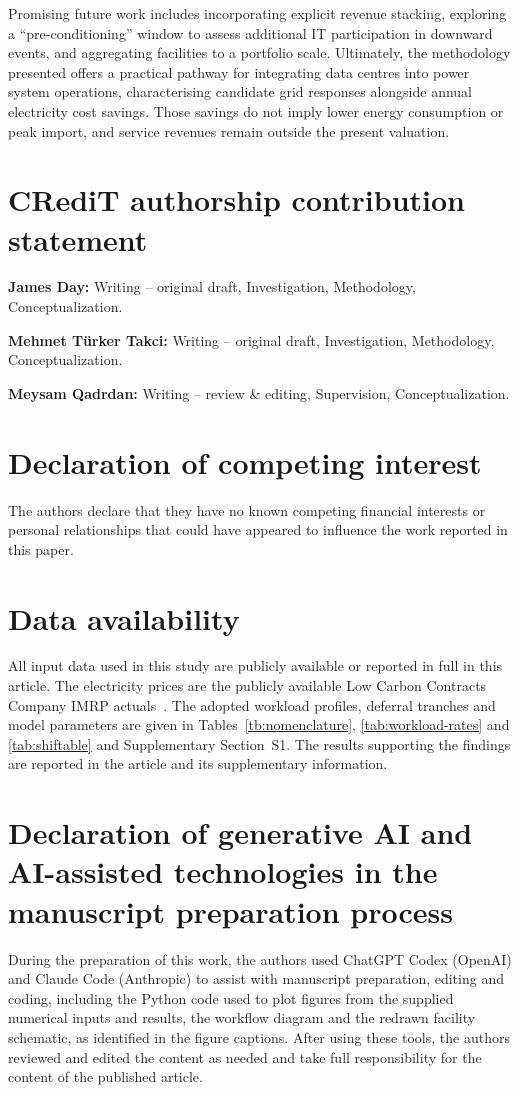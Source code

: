 \documentclass[lettersize,journal]{IEEEtran}
\begin{document}
Promising future work includes incorporating explicit revenue stacking, exploring a ``pre-conditioning'' window to assess additional IT participation in downward events, and aggregating facilities to a portfolio scale. Ultimately, the methodology presented offers a practical pathway for integrating data centres into power system operations, characterising candidate grid responses alongside annual electricity cost savings. Those savings do not imply lower energy consumption or peak import, and service revenues remain outside the present valuation.

\section*{CRediT authorship contribution statement}
\noindent\textbf{James Day:} Writing -- original draft, Investigation, Methodology, Conceptualization.

\noindent\textbf{Mehmet T\"urker Takci:} Writing -- original draft, Investigation, Methodology, Conceptualization.

\noindent\textbf{Meysam Qadrdan:} Writing -- review \& editing, Supervision, Conceptualization.

\section*{Declaration of competing interest}
The authors declare that they have no known competing financial interests or personal relationships that could have appeared to influence the work reported in this paper.

\section*{Data availability}
All input data used in this study are publicly available or reported in full in this article. The electricity prices are the publicly available Low Carbon Contracts Company IMRP actuals~\cite{lccc_imrp_actuals}. The adopted workload profiles, deferral tranches and model parameters are given in Tables~\ref{tb:nomenclature}, \ref{tab:workload-rates} and \ref{tab:shiftable} and Supplementary Section~S1. The results supporting the findings are reported in the article and its supplementary information.

\section*{Declaration of generative AI and AI-assisted technologies in the manuscript preparation process}
During the preparation of this work, the authors used ChatGPT Codex (OpenAI) and Claude Code (Anthropic) to assist with manuscript preparation, editing and coding, including the Python code used to plot figures from the supplied numerical inputs and results, the workflow diagram and the redrawn facility schematic, as identified in the figure captions. After using these tools, the authors reviewed and edited the content as needed and take full responsibility for the content of the published article.
\end{document}
